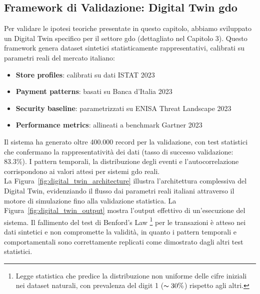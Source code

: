 \subsection{\texorpdfstring{Framework di Validazione: Digital Twin \gls{gdo}}{2.1.1 - Framework di Validazione: Digital Twin GDO}}

Per validare le ipotesi teoriche presentate in questo capitolo, 
abbiamo sviluppato un Digital Twin specifico per il settore \gls{gdo} 
(dettagliato nel Capitolo 3). Questo framework genera dataset 
sintetici statisticamente rappresentativi, calibrati su parametri 
reali del mercato italiano:

\begin{itemize}
    \item \textbf{Store profiles}: calibrati su dati ISTAT 2023
    \item \textbf{Payment patterns}: basati su Banca d'Italia 2023
    \item \textbf{Security baseline}: parametrizzati su ENISA Threat Landscape 2023
    \item \textbf{Performance metrics}: allineati a benchmark Gartner 2023
\end{itemize}

Il sistema ha generato oltre 400.000 record per la validazione, 
con test statistici che confermano la rappresentatività dei dati 
(tasso di successo validazione: 83.3\%). I pattern temporali, 
la distribuzione degli eventi e l'autocorrelazione corrispondono 
ai valori attesi per sistemi \gls{gdo} reali.\\
La Figura~\ref{fig:digital_twin_architecture} illustra l'architettura 
complessiva del Digital Twin, evidenziando il flusso dai parametri reali 
italiani attraverso il motore di simulazione fino alla validazione statistica. 
La Figura~\ref{fig:digital_twin_output} mostra l'output effettivo di 
un'esecuzione del sistema.
Il fallimento del test di Benford's Law \footnote{Legge statistica che predice 
la distribuzione non uniforme delle cifre iniziali nei dataset naturali, con 
prevalenza del digit 1 ($\thicksim 30\%$) rispetto agli altri.} per le transazioni è atteso nei 
dati sintetici e non compromette la validità, in quanto i pattern temporali e comportamentali sono correttamente replicati come dimostrato dagli altri test statistici.

